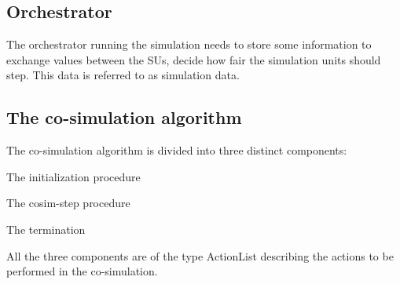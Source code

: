 \subsection{Orchestrator}
The orchestrator running the simulation needs to store some information to exchange values between the SUs, decide how fair the simulation units should step.
This data is referred to as simulation data.

\subsection{The co-simulation algorithm}
The co-simulation algorithm is divided into three distinct components: 
\begin{compactitem}
  \item The initialization procedure
  \item The cosim-step procedure 
  \item The termination
\end{compactitem}
All the three components are of the type ActionList describing the actions to be performed in the co-simulation.